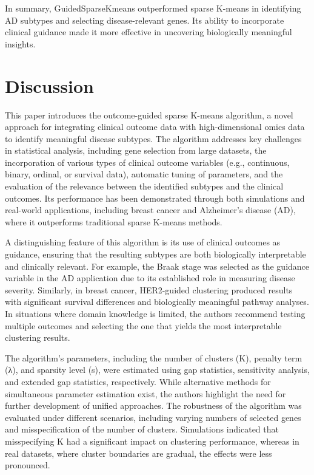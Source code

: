 \documentclass{statsoc}
\begin{document}
In summary, GuidedSparseKmeans outperformed sparse K-means in identifying AD subtypes and selecting disease-relevant genes. Its ability to incorporate clinical guidance made it more effective in uncovering biologically meaningful insights.

\section{Discussion}
This paper introduces the outcome-guided sparse K-means algorithm, a novel approach for integrating clinical outcome data with high-dimensional omics data to identify meaningful disease subtypes. The algorithm addresses key challenges in statistical analysis, including gene selection from large datasets, the incorporation of various types of clinical outcome variables (e.g., continuous, binary, ordinal, or survival data), automatic tuning of parameters, and the evaluation of the relevance between the identified subtypes and the clinical outcomes. Its performance has been demonstrated through both simulations and real-world applications, including breast cancer and Alzheimer’s disease (AD), where it outperforms traditional sparse K-means methods.

A distinguishing feature of this algorithm is its use of clinical outcomes as guidance, ensuring that the resulting subtypes are both biologically interpretable and clinically relevant. For example, the Braak stage was selected as the guidance variable in the AD application due to its established role in measuring disease severity. Similarly, in breast cancer, HER2-guided clustering produced results with significant survival differences and biologically meaningful pathway analyses. In situations where domain knowledge is limited, the authors recommend testing multiple outcomes and selecting the one that yields the most interpretable clustering results. 

The algorithm’s parameters, including the number of clusters (K), penalty term (λ), and sparsity level (s), were estimated using gap statistics, sensitivity analysis, and extended gap statistics, respectively. While alternative methods for simultaneous parameter estimation exist, the authors highlight the need for further development of unified approaches. The robustness of the algorithm was evaluated under different scenarios, including varying numbers of selected genes and misspecification of the number of clusters. Simulations indicated that misspecifying K had a significant impact on clustering performance, whereas in real datasets, where cluster boundaries are gradual, the effects were less pronounced.
\end{document}
